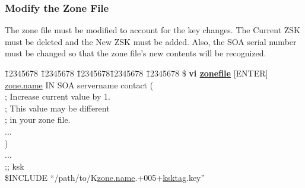 
\subsubsection{Modify the Zone File}
\label{update-zonefile-newzsks}

The zone file must be modified to account for the key changes.  The Current
ZSK must be deleted and the New ZSK must be added.  Also, the SOA serial
number must be changed so that the zone file's new contents will be recognized.

\begin{tabbing}
\hspace{0.5in} \= 12345678 \= 12345678 \= 12345678\= 12345678 \= 12345678 \kill
\hspace{0.5in}\$ {\bf vi \underline{zonefile}} $[$ENTER$]$ \\
\hspace{0.5in}\underline{zone.name} \> \> \> IN \> SOA \> servername contact (\\
\hspace{3.5in}{\bf 2005092108} ; Increase current value by 1. \\
\hspace{4.4in};  This value may be different \\
\hspace{4.4in}; in your zone file. \\
\hspace{0.5in}\>           \>         ... \\
\hspace{0.5in}\>              ) \\
\hspace{0.5in}... \\
\hspace{0.5in};; ksk \\
\hspace{0.5in}\$INCLUDE ``/path/to/K\underline{zone.name}.+005+\underline{ksktag}.key'' \\
 \\
 \\
 \\
 \\

\end{tabbing}
